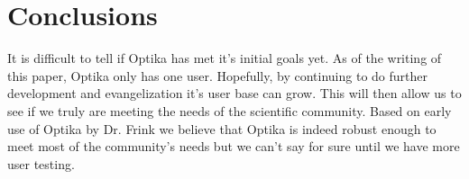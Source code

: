 \section{Conclusions}
It is difficult to tell if Optika has met it's initial goals yet. As of the writing of this paper, Optika only has one user. Hopefully, by continuing to do
further development and evangelization it's user base can grow. This will then allow us to see if we truly are meeting the needs of the scientific community.
Based on early use of Optika by Dr. Frink we believe that Optika is indeed robust enough to meet most of the community's needs but we can't say for sure
until we have more user testing.

